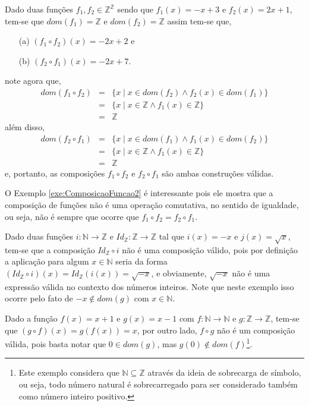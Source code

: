 \begin{exemplo}\label{exe:ComposicaoFuncao2}
	Dado duas funções $f_1, f_2 \in \mathbb{Z}^{\mathbb{Z}}$ sendo que $f_1(x) = -x + 3$ e $f_2(x) = 2x + 1$, tem-se que $dom(f_1)  =  \mathbb{Z}$ e $dom(f_2)  =  \mathbb{Z}$ assim tem-se que,
	\begin{itemize}
		\item[(a)] $(f_1 \circ f_2)(x) = -2x + 2$ e
		\item[(b)] $(f_2 \circ f_1)(x) = -2x + 7$.
	\end{itemize}
	note agora que,
	\begin{eqnarray*}
		dom(f_1 \circ f_2) & = & \{x \mid x \in dom(f_2) \land f_2(x) \in dom(f_1)\}\\ 
		& = & \{x \mid x \in \mathbb{Z} \land f_1(x) \in \mathbb{Z}\}\\
		& = & \mathbb{Z}
	\end{eqnarray*}
	além disso, 
	\begin{eqnarray*}
		dom(f_2 \circ f_1) & = & \{x \mid x \in dom(f_1) \land f_1(x) \in dom(f_2)\}\\ 
		& = & \{x \mid x \in \mathbb{Z} \land f_1(x) \in \mathbb{Z}\}\\
		& = & \mathbb{Z}
	\end{eqnarray*}
	e, portanto, as composições $f_1 \circ f_2$ e $f_2 \circ f_1$ são ambas construções válidas.
\end{exemplo}

O Exemplo \ref{exe:ComposicaoFuncao2} é interessante pois ele mostra que a composição de funções não é uma operação comutativa, no sentido de igualdade, ou seja, não é sempre que ocorre que $f_1 \circ f_2 = f_2 \circ f_1$. 

\begin{exemplo}\label{exe:ComposicaoFuncao3}
	Dado duas funções $i: \mathbb{N} \rightarrow \mathbb{Z}$ e $Id_\mathbb{Z} : \mathbb{Z} \rightarrow \mathbb{Z}$ tal que $i(x) = -x$ e $j(x) = \sqrt{x}$, tem-se que a composição $Id_\mathbb{Z} \circ i$ não é uma composição válido, pois por definição a aplicação para algum $x \in \mathbb{N}$ seria da forma $(Id_\mathbb{Z} \circ i)(x) = Id_\mathbb{Z}(i(x)) = \sqrt{-x}$, e obviamente, $\sqrt{-x}$ não é uma expressão válida no contexto dos números inteiros. Note que neste exemplo isso ocorre pelo fato de $-x \notin dom(g)$ com $x \in \mathbb{N}$.
\end{exemplo}

\begin{exemplo}\label{exe:ComposicaoFuncao4}
  Dado a função $f(x) = x + 1$ e $g(x) = x - 1$ com $f: \mathbb{N} \rightarrow \mathbb{N}$ e $g: \mathbb{Z} \rightarrow \mathbb{Z}$, tem-se que $(g \circ f)(x) = g(f(x)) = x$, por outro lado, $f \circ g$ não é um composição válida, pois basta notar que $0 \in dom(g)$, mas $g(0) \notin dom(f)$\footnote{Este exemplo considera que $\mathbb{N} \subseteq \mathbb{Z}$ através da ideia de sobrecarga de símbolo, ou seja, todo número natural é sobrecarregado para ser considerado também como número inteiro positivo.}. 
\end{exemplo}

